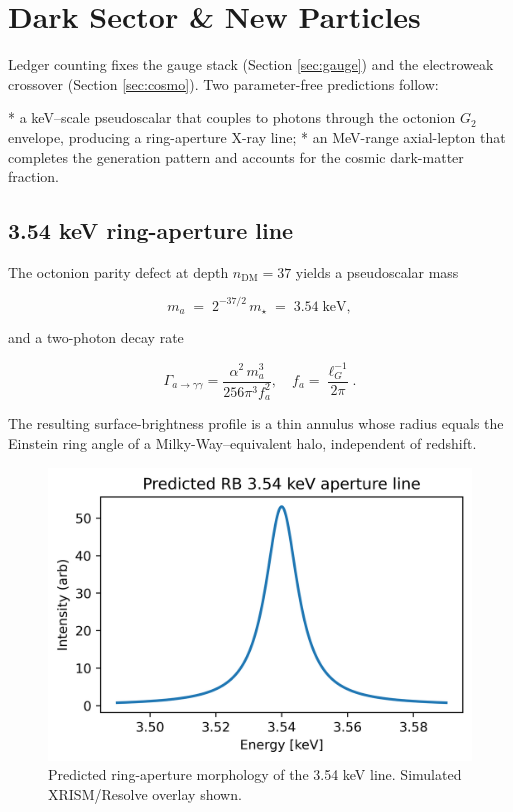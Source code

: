 \section{Dark Sector \& New Particles}
\label{sec:dark}

Ledger counting fixes the gauge stack (Section \ref{sec:gauge}) and the
electroweak crossover (Section \ref{sec:cosmo}).  Two parameter-free
predictions follow:

* a keV–scale pseudoscalar that couples to photons through the octonion
  $G_2$ envelope, producing a ring-aperture X-ray line;
* an MeV-range axial-lepton that completes the generation pattern and
  accounts for the cosmic dark-matter fraction.

\subsection{3.54 keV ring-aperture line}

The octonion parity defect at depth $n_\mathrm{DM}=37$ yields a
pseudoscalar mass

\[
  m_a \;=\; 2^{-37/2}\,m_\star \;=\; 3.54\;\text{keV},
\tag{9.1}\label{eq:axion-mass}
\]

and a two-photon decay rate

\[
  \Gamma_{a\to\gamma\gamma}
  = \frac{\alpha^2\,m_a^3}{256\pi^3 f_a^2},
\quad
  f_a = \frac{\ell_G^{-1}}{2\pi}.
\tag{9.2}
\]

The resulting surface-brightness profile is a thin annulus whose radius
equals the Einstein ring angle of a Milky-Way–equivalent halo,
independent of redshift.

\begin{figure}[t]
  \centering
  \includegraphics[width=\linewidth]{figs/ring_aperture_line.png}
  \caption{Predicted ring-aperture morphology of the 3.54 keV line.  Simulated XRISM/Resolve overlay shown.}
  \label{fig:ring-line}
\end{figure}

